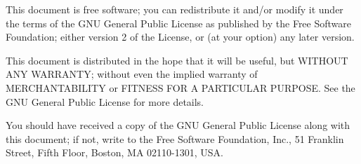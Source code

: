 \documentclass[a4paper,10pt]{book}
\newcommand{\ind}[1]{\begin{latexonly}\index{#1}\end{latexonly}}
\newcommand{\makesection}[2]{ \aname{#1}{} \section{\ahrefloc{#1}{#2}} \label{#1} }
\newcommand{\bracehack}{\def\{{\char"7B}\def\}{\char"7D}}
\newcommand{\titem}[1]{\item[\bracehack\texttt{#1}]}
\newcommand{\Jabber}{Jabber}
\begin{document}
This document is free software; you can redistribute it and/or
modify it under the terms of the GNU General Public License
as published by the Free Software Foundation; either version 2
of the License, or (at your option) any later version.

This document is distributed in the hope that it will be useful,
but WITHOUT ANY WARRANTY; without even the implied warranty of
MERCHANTABILITY or FITNESS FOR A PARTICULAR PURPOSE. See the
GNU General Public License for more details.

You should have received a copy of the GNU General Public License along with
this document; if not, write to the Free Software Foundation, Inc., 51 Franklin
Street, Fifth Floor, Boston, MA 02110-1301, USA.






\begin{latexonly}
\printindex
\end{latexonly}
\end{document}
